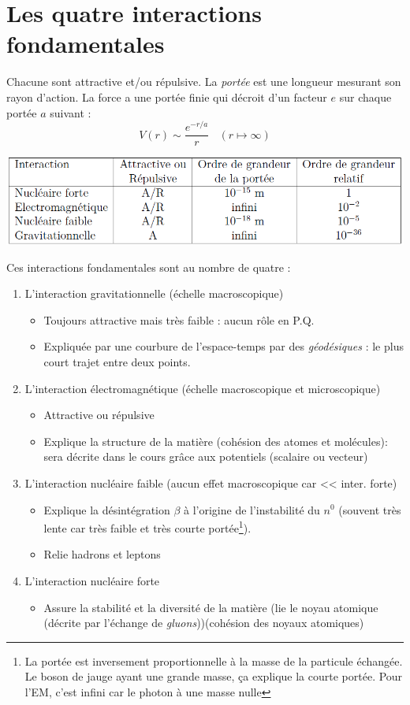 \documentclass	[11pt, a4paper, openany]{book}
\begin{document}
\section{Les quatre interactions fondamentales}
Chacune sont attractive et/ou répulsive. La \textit{portée} est une longueur mesurant son rayon d'action. La force a une portée finie qui décroit d'un facteur $e$ sur chaque portée $a$ suivant :
\begin{equation}
V(r) \sim \frac{e^{-r/a}}{r}\ \ \ \ (r \mapsto \infty)
\end{equation}
\begin{center}
\includegraphics[scale=0.5]{img/interf}
\end{center}
Ces interactions fondamentales sont au nombre de quatre :
\begin{enumerate}
\item L'interaction gravitationnelle (échelle macroscopique)
\begin{itemize}
\item Toujours attractive mais très faible : aucun rôle en P.Q.
\item Expliquée par une courbure de l'espace-temps par des \textit{géodésiques} : le plus court trajet entre deux points.
\end{itemize}
\item L'interaction électromagnétique (échelle macroscopique et microscopique)
\begin{itemize}
\item Attractive ou répulsive
\item Explique la structure de la matière (cohésion des atomes et molécules): sera décrite dans le cours grâce aux potentiels (scalaire ou vecteur)
\end{itemize}
\item L'interaction nucléaire faible (aucun effet macroscopique car << inter. forte)
\begin{itemize}
\item Explique la désintégration $\beta$ à l'origine de l'instabilité du $n^0$ (souvent très lente car très faible et très courte portée\footnote{La portée est inversement proportionnelle à la masse de la particule échangée. Le boson de jauge ayant une grande masse, ça explique la courte portée. Pour l'EM, c'est infini car le photon à une masse nulle}).
\item Relie hadrons et leptons
\end{itemize}
\item L'interaction nucléaire forte
\begin{itemize}

\item Assure la stabilité et la diversité de la matière (lie le noyau atomique (décrite par l'échange de \textit{gluons}))(cohésion des noyaux atomiques)
\end{itemize}
\end{enumerate}
\end{document}
